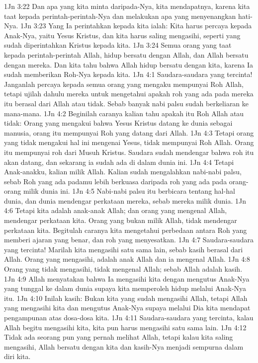 1Jn 3:22  Dan apa yang kita minta daripada-Nya, kita mendapatnya, karena kita taat kepada perintah-perintah-Nya dan melakukan apa yang menyenangkan hati-Nya.
1Jn 3:23  Yang Ia perintahkan kepada kita ialah: Kita harus percaya kepada Anak-Nya, yaitu Yesus Kristus, dan kita harus saling mengasihi, seperti yang sudah diperintahkan Kristus kepada kita.
1Jn 3:24  Semua orang yang taat kepada perintah-perintah Allah, hidup bersatu dengan Allah, dan Allah bersatu dengan mereka. Dan kita tahu bahwa Allah hidup bersatu dengan kita, karena Ia sudah memberikan Roh-Nya kepada kita.
1Jn 4:1  Saudara-saudara yang tercinta! Janganlah percaya kepada semua orang yang mengaku mempunyai Roh Allah, tetapi ujilah dahulu mereka untuk mengetahui apakah roh yang ada pada mereka itu berasal dari Allah atau tidak. Sebab banyak nabi palsu sudah berkeliaran ke mana-mana.
1Jn 4:2  Beginilah caranya kalian tahu apakah itu Roh Allah atau tidak: Orang yang mengakui bahwa Yesus Kristus datang ke dunia sebagai manusia, orang itu mempunyai Roh yang datang dari Allah.
1Jn 4:3  Tetapi orang yang tidak mengakui hal ini mengenai Yesus, tidak mempunyai Roh Allah. Orang itu mempunyai roh dari Musuh Kristus. Saudara sudah mendengar bahwa roh itu akan datang, dan sekarang ia sudah ada di dalam dunia ini.
1Jn 4:4  Tetapi Anak-anakku, kalian milik Allah. Kalian sudah mengalahkan nabi-nabi palsu, sebab Roh yang ada padamu lebih berkuasa daripada roh yang ada pada orang-orang milik dunia ini.
1Jn 4:5  Nabi-nabi palsu itu berbicara tentang hal-hal dunia, dan dunia mendengar perkataan mereka, sebab mereka milik dunia.
1Jn 4:6  Tetapi kita adalah anak-anak Allah; dan orang yang mengenal Allah, mendengar perkataan kita. Orang yang bukan milik Allah, tidak mendengar perkataan kita. Begitulah caranya kita mengetahui perbedaan antara Roh yang memberi ajaran yang benar, dan roh yang menyesatkan.
1Jn 4:7  Saudara-saudara yang tercinta! Marilah kita mengasihi satu sama lain, sebab kasih berasal dari Allah. Orang yang mengasihi, adalah anak Allah dan ia mengenal Allah.
1Jn 4:8  Orang yang tidak mengasihi, tidak mengenal Allah; sebab Allah adalah kasih.
1Jn 4:9  Allah menyatakan bahwa Ia mengasihi kita dengan mengutus Anak-Nya yang tunggal ke dalam dunia supaya kita memperoleh hidup melalui Anak-Nya itu.
1Jn 4:10  Inilah kasih: Bukan kita yang sudah mengasihi Allah, tetapi Allah yang mengasihi kita dan mengutus Anak-Nya supaya melalui Dia kita mendapat pengampunan atas dosa-dosa kita.
1Jn 4:11  Saudara-saudara yang tercinta, kalau Allah begitu mengasihi kita, kita pun harus mengasihi satu sama lain.
1Jn 4:12  Tidak ada seorang pun yang pernah melihat Allah, tetapi kalau kita saling mengasihi, Allah bersatu dengan kita dan kasih-Nya menjadi sempurna dalam diri kita.
